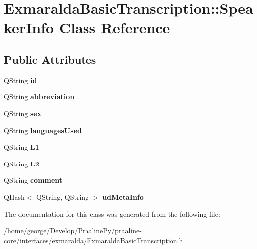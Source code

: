 \hypertarget{class_exmaralda_basic_transcription_1_1_speaker_info}{}\section{Exmaralda\+Basic\+Transcription\+:\+:Speaker\+Info Class Reference}
\label{class_exmaralda_basic_transcription_1_1_speaker_info}
\subsection*{Public Attributes}
\begin{DoxyCompactItemize}
\item 
\mbox{\label{class_exmaralda_basic_transcription_1_1_speaker_info_a70201c432f380b2700a93bff7bcd577b}} 
Q\+String {\bfseries id}
\item 
\mbox{\label{class_exmaralda_basic_transcription_1_1_speaker_info_a1e15d3884b69934eea4af273281c4271}} 
Q\+String {\bfseries abbreviation}
\item 
\mbox{\label{class_exmaralda_basic_transcription_1_1_speaker_info_a6f331395e3325a64fe4210130d6a7412}} 
Q\+String {\bfseries sex}
\item 
\mbox{\label{class_exmaralda_basic_transcription_1_1_speaker_info_adb8d2dacfb270b12cf7cdd0680e0b98b}} 
Q\+String {\bfseries languages\+Used}
\item 
\mbox{\label{class_exmaralda_basic_transcription_1_1_speaker_info_a709ee179789cf6ac12b23cce9f590846}} 
Q\+String {\bfseries L1}
\item 
\mbox{\label{class_exmaralda_basic_transcription_1_1_speaker_info_a918744ee29b3a49c746138d89130b4ec}} 
Q\+String {\bfseries L2}
\item 
\mbox{\label{class_exmaralda_basic_transcription_1_1_speaker_info_abea56d8336681c324c2995d4b9560705}} 
Q\+String {\bfseries comment}
\item 
\mbox{\label{class_exmaralda_basic_transcription_1_1_speaker_info_ae7603752900dfa6ead30c60efc5ef17a}} 
Q\+Hash$<$ Q\+String, Q\+String $>$ {\bfseries ud\+Meta\+Info}
\end{DoxyCompactItemize}


The documentation for this class was generated from the following file\+:\begin{DoxyCompactItemize}
\item 
/home/george/\+Develop/\+Praaline\+Py/praaline-\/core/interfaces/exmaralda/Exmaralda\+Basic\+Transcription.\+h\end{DoxyCompactItemize}
